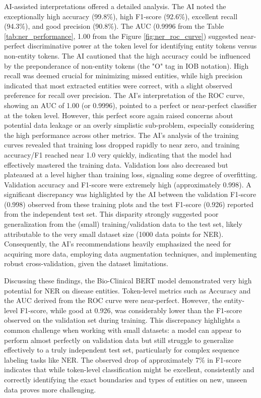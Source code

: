 AI-assisted interpretations offered a detailed analysis. The AI noted the exceptionally high accuracy (99.8\%), high F1-score (92.6\%), excellent recall (94.3\%), and good precision (90.8\%). The AUC (0.9996 from the Table \ref{tab:ner_performance}, 1.00 from the Figure \ref{fig:ner_roc_curve}) suggested near-perfect discriminative power at the token level for identifying entity tokens versus non-entity tokens. The AI cautioned that the high accuracy could be influenced by the preponderance of non-entity tokens (the "O" tag in IOB notation). High recall was deemed crucial for minimizing missed entities, while high precision indicated that most extracted entities were correct, with a slight observed preference for recall over precision. The AI's interpretation of the ROC curve, showing an AUC of 1.00 (or 0.9996), pointed to a perfect or near-perfect classifier at the token level. However, this perfect score again raised concerns about potential data leakage or an overly simplistic sub-problem, especially considering the high performance across other metrics. The AI's analysis of the training curves revealed that training loss dropped rapidly to near zero, and training accuracy/F1 reached near 1.0 very quickly, indicating that the model had effectively mastered the training data. Validation loss also decreased but plateaued at a level higher than training loss, signaling some degree of overfitting. Validation accuracy and F1-score were extremely high (approximately 0.998). A significant discrepancy was highlighted by the AI between the validation F1-score (0.998) observed from these training plots and the test F1-score (0.926) reported from the independent test set. This disparity strongly suggested poor generalization from the (small) training/validation data to the test set, likely attributable to the very small dataset size (1000 data points for NER). Consequently, the AI's recommendations heavily emphasized the need for acquiring more data, employing data augmentation techniques, and implementing robust cross-validation, given the dataset limitations.

Discussing these findings, the Bio-Clinical BERT model demonstrated very high potential for NER on disease entities. Token-level metrics such as Accuracy and the AUC derived from the ROC curve were near-perfect. However, the entity-level F1-score, while good at 0.926, was considerably lower than the F1-score observed on the validation set during training. This discrepancy highlights a common challenge when working with small datasets: a model can appear to perform almost perfectly on validation data but still struggle to generalize effectively to a truly independent test set, particularly for complex sequence labeling tasks like NER. The observed drop of approximately 7\% in F1-score indicates that while token-level classification might be excellent, consistently and correctly identifying the exact boundaries and types of entities on new, unseen data proves more challenging.

